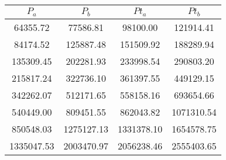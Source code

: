\begin{large}\begin{tabular}{|c|c|c|c|}
\hline
$P_a$&$P_b$&$Pt_a$&$Pt_b$\\\hline
64355.72&77586.81&98100.00&121914.41\\\hline
84174.52&125887.48&151509.92&188289.94\\\hline
135309.45&202281.93&233998.54&290803.20\\\hline
215817.24&322736.10&361397.55&449129.15\\\hline
342262.07&512171.65&558158.16&693654.66\\\hline
540449.00&809451.55&862043.82&1071310.54\\\hline
850548.03&1275127.13&1331378.10&1654578.75\\\hline
1335047.53&2003470.97&2056238.46&2555403.65\\\hline
\end{tabular}
\end{large}